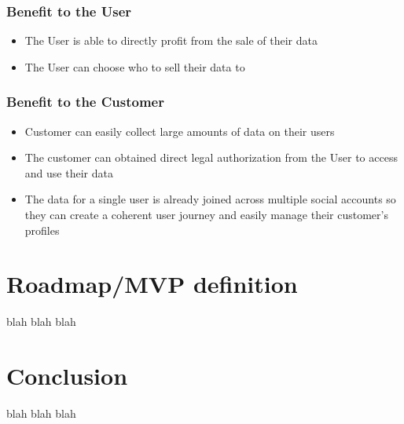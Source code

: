\documentclass[12pt, letterpaper, twoside]{article}
\begin{document}
\subsubsection*{Benefit to the User}
\begin{itemize}
\item The User is able to directly profit from the sale of their data
\item The User can choose who to sell their data to
\end{itemize}


\subsubsection*{Benefit to the Customer}
\begin{itemize}
\item Customer can easily collect large amounts of data on their users
\item The customer can obtained direct legal authorization from the User to access and use their data
\item The data for a single user is already joined across multiple social accounts so they can create a coherent user journey and easily manage their customer's profiles
\end{itemize}



\section{Roadmap/MVP definition}
blah blah blah

\section{Conclusion}
blah blah blah
\end{document}
